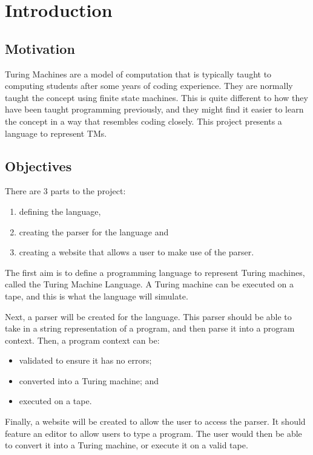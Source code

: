 \chapter{Introduction}


\section{Motivation}
Turing Machines are a model of computation that is typically taught to computing students after some years of coding experience. They are normally taught the concept using finite state machines. This is quite different to how they have been taught programming previously, and they might find it easier to learn the concept in a way that resembles coding closely. This project presents a language to represent TMs.

\section{Objectives}
There are 3 parts to the project:
\begin{enumerate}
    \item defining the language, 
    \item creating the parser for the language and 
    \item creating a website that allows a user to make use of the parser.
\end{enumerate}

The first aim is to define a programming language to represent Turing machines, called the Turing Machine Language. A Turing machine can be executed on a tape, and this is what the language will simulate. 

Next, a parser will be created for the language. This parser should be able to take in a string representation of a program, and then parse it into a program context. Then, a program context can be:
\begin{itemize}
    \item validated to ensure it has no errors;
    \item converted into a Turing machine; and
    \item executed on a tape.
\end{itemize}

Finally, a website will be created to allow the user to access the parser. It should feature an editor to allow users to type a program. The user would then be able to convert it into a Turing machine, or execute it on a valid tape.

